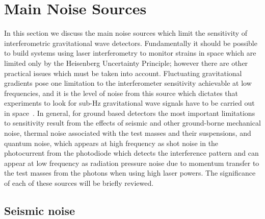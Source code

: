 \documentclass{article}
\begin{document}

\newpage

\section{Main Noise Sources}
\label{section:noise}

In this section we discuss the main noise sources which limit the sensitivity of
interferometric gravitational wave detectors. Fundamentally it should be
possible to build systems using laser interferometry to monitor strains in space
which are limited only by the Heisenberg Uncertainty Principle; however there
are other practical issues which must be taken into account. Fluctuating
gravitational gradients pose one limitation to the interferometer sensitivity
achievable at low frequencies, and it is the level of noise from this source
which dictates that experiments to look for sub-Hz gravitational wave signals
have to be carried out in space~\cite{Spero, Saulson1, Beccaria, Thorne:1998}.
In general, for ground based detectors the most important limitations to
sensitivity result from the effects of seismic and other ground-borne mechanical
noise, thermal noise associated with the test masses and their suspensions, and
quantum noise, which appears at high frequency as shot noise in the photocurrent
from the photodiode which detects the interference pattern and can appear at low
frequency as radiation pressure noise due to momentum transfer to the test
masses from the photons when using high laser powers. The significance of each
of these sources will be briefly reviewed.


\subsection{Seismic noise}
\label{subsection:seismic}
\end{document}
